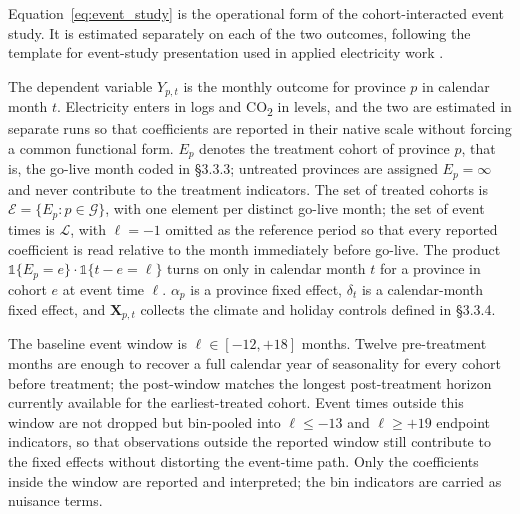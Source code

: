 \documentclass[12pt,a4paper]{article}
\begin{document}

Equation~\eqref{eq:event_study} is the operational form of the
cohort-interacted event study. It is estimated separately on each of
the two outcomes, following the template for event-study presentation
used in applied electricity work
\citep{deryuginaetal-2020-longrundynamicselectricity}.

The dependent variable $Y_{p,t}$ is the monthly outcome for province
$p$ in calendar month $t$. Electricity enters in logs and
CO\textsubscript{2} in levels, and the two are estimated in separate
runs so that coefficients are reported in their native scale without
forcing a common functional form. $E_p$ denotes the treatment cohort
of province $p$, that is, the go-live month coded in §3.3.3; untreated
provinces are assigned $E_p = \infty$ and never contribute to the
treatment indicators. The set of treated cohorts is
$\mathcal{E} = \{E_p : p \in \mathcal{G}\}$, with one element per
distinct go-live month; the set of event times is $\mathcal{L}$, with
$\ell = -1$ omitted as the reference period so that every reported
coefficient is read relative to the month immediately before go-live.
The product
$\mathbb{1}\{E_p = e\} \cdot \mathbb{1}\{t - e = \ell\}$ turns on only
in calendar month $t$ for a province in cohort $e$ at event time
$\ell$. $\alpha_p$ is a province fixed effect, $\delta_t$ is a
calendar-month fixed effect, and $\mathbf{X}_{p,t}$ collects the
climate and holiday controls defined in §3.3.4.

The baseline event window is $\ell \in [-12, +18]$ months. Twelve
pre-treatment months are enough to recover a full calendar year of
seasonality for every cohort before treatment; the post-window
matches the longest post-treatment horizon currently available for
the earliest-treated cohort. Event times outside this window are not
dropped but bin-pooled into $\ell \leq -13$ and $\ell \geq +19$
endpoint indicators, so that observations outside the reported window
still contribute to the fixed effects without distorting the
event-time path. Only the coefficients inside the window are reported
and interpreted; the bin indicators are carried as nuisance terms.
\end{document}
